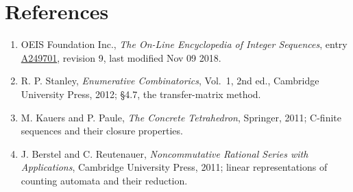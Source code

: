 \documentclass[11pt]{article}
\theoremstyle{definition}
\begin{document}
\section{References}

\begin{enumerate}

\item OEIS Foundation Inc., \emph{The On-Line Encyclopedia of Integer Sequences}, entry \href{https://oeis.org/A249701}{A249701}, revision 9, last modified Nov 09 2018.

\item R. P. Stanley, \emph{Enumerative Combinatorics}, Vol.~1, 2nd ed., Cambridge University Press, 2012; \S4.7, the transfer-matrix method.

\item M. Kauers and P. Paule, \emph{The Concrete Tetrahedron}, Springer, 2011; C-finite sequences and their closure properties.

\item J. Berstel and C. Reutenauer, \emph{Noncommutative Rational Series with Applications}, Cambridge University Press, 2011; linear representations of counting automata and their reduction.

\end{enumerate}
\end{document}

